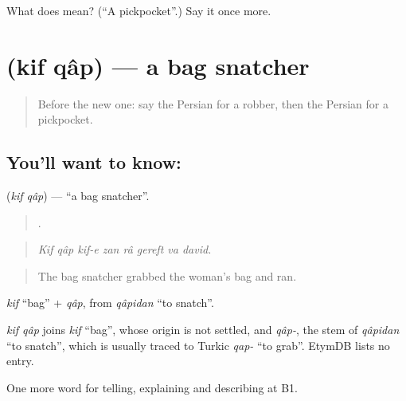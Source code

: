 \begin{tcolorbox}[breakable,colback=teal!4,colframe=teal!35!black,title={Before you move on}]
What does   mean? (\textquotedblleft{}A pickpocket\textquotedblright{}.) Say it once more.
\end{tcolorbox}
\section[\texorpdfstring{\fa{کیف} \fa{قاپ} (kif qâp)}{کیف قاپ (kif qâp)}]{  (kif qâp) — a bag snatcher}

\label{lesson:FA-C316-kif-qap}



\begin{quote}
Before the new one: say the Persian for a robber, then the Persian for a pickpocket.
\end{quote}

\subsection*{You'll want to know:  }
\textbf{ } (\emph{kif qâp}) — \textquotedblleft{}a bag snatcher\textquotedblright{}.

\begin{quote}
       .
\end{quote}

\begin{quote}
\emph{Kif qâp kif-e zan râ gereft va david.}
\end{quote}

\begin{quote}
The bag snatcher grabbed the woman's bag and ran.
\end{quote}

\emph{kif} \textquotedblleft{}bag\textquotedblright{} + \emph{qâp}, from \emph{qâpidan} \textquotedblleft{}to snatch\textquotedblright{}.

\begin{cousinweb}
\emph{kif qâp} joins \emph{kif} \textquotedblleft{}bag\textquotedblright{}, whose origin is not settled, and \emph{qâp-}, the stem of \emph{qâpidan} \textquotedblleft{}to snatch\textquotedblright{}, which is usually traced to Turkic \emph{qap-} \textquotedblleft{}to grab\textquotedblright{}. EtymDB lists no entry.
\end{cousinweb}

\begin{grammarlens}[title={What you've built}]
One more word for telling, explaining and describing at B1.
\end{grammarlens}

